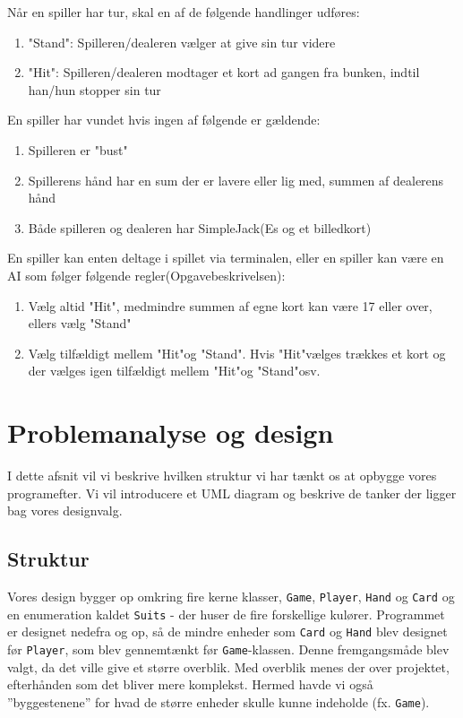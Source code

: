\documentclass[a4paper]{article}
\begin{document}
    Når en spiller har tur, skal en af de følgende handlinger udføres:
    \begin{enumerate}
      \item "Stand": Spilleren/dealeren vælger at give sin tur videre
      \item "Hit": Spilleren/dealeren modtager et kort ad gangen fra bunken,
      indtil han/hun stopper sin tur
    \end{enumerate}

    En spiller har vundet hvis ingen af følgende er gældende:
    \begin{enumerate}
      \item Spilleren er "bust"
      \item Spillerens hånd har en sum der er lavere eller lig med,
      summen af dealerens hånd
      \item Både spilleren og dealeren har SimpleJack(Es og et billedkort)
    \end{enumerate}

    En spiller kan enten deltage i spillet via terminalen,
    eller en spiller kan være en AI som følger følgende regler(Opgavebeskrivelsen):
    \begin{enumerate}
      \item Vælg altid "Hit", medmindre summen af egne kort kan være 17 eller over, ellers vælg "Stand"
      \item Vælg tilfældigt mellem "Hit"og "Stand". Hvis "Hit"vælges trækkes et kort og der vælges igen tilfældigt mellem "Hit"og "Stand"osv.
    \end{enumerate}
  \newpage

  \section{Problemanalyse og design} \label{sec:design}
    I dette afsnit vil vi beskrive hvilken struktur vi har tænkt os at opbygge vores programefter.
    Vi vil introducere et UML diagram og beskrive de tanker der ligger bag vores designvalg.

    \subsection*{Struktur}
      Vores design bygger op omkring fire kerne klasser,
      \texttt{Game}, \texttt{\texttt{Player}}, \texttt{\texttt{Hand}} og \texttt{\texttt{Card}} og en enumeration kaldet \texttt{\texttt{Suits}} - der huser de fire forskellige kulører.
      Programmet er designet nedefra og op, så de mindre enheder som \texttt{\texttt{Card}} og \texttt{\texttt{Hand}} blev designet før \texttt{\texttt{Player}}, som blev gennemtænkt før \texttt{Game}-klassen. 
      Denne fremgangsmåde blev valgt, da det ville give et større overblik. Med overblik menes der over projektet, efterhånden som det bliver mere komplekst. Hermed havde vi også ”byggestenene” for hvad de større enheder skulle kunne indeholde (fx. \texttt{Game}).
\end{document}
